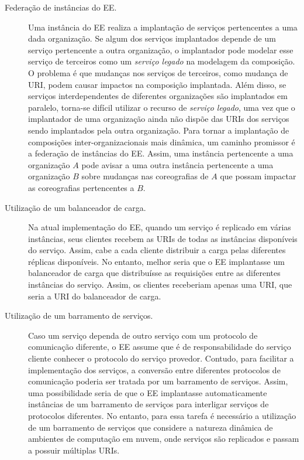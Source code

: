 \begin{description}
\item[Federação de instâncias do EE.] Uma instância do EE realiza a implantação
de serviços pertencentes a uma dada organização. Se algum dos serviços implantados
depende de um serviço pertencente a outra organização, o implantador
pode modelar esse serviço de terceiros como um \emph{serviço legado}
na modelagem da composição. O problema é que mudanças nos serviços de
terceiros, como mudança de URI, podem causar impactos na composição implantada.
Além disso, se serviços interdependentes de diferentes organizações são implantados em paralelo,
torna-se difícil utilizar o recurso de \emph{serviço legado},
uma vez que o implantador de uma organização ainda não dispõe das URIs 
dos serviços sendo implantados pela outra organização.
Para tornar a implantação de composições inter-organizacionais mais dinâmica,
um caminho promissor é a federação de instâncias do EE.
Assim, uma instância pertencente a uma organização $A$ pode avisar a
uma outra instância pertencente a uma organização $B$ sobre mudanças 
nas coreografias de $A$ que possam impactar as coreografias pertencentes a $B$.

\item[Utilização de um balanceador de carga.] Na atual implementação do EE,
quando um serviço é replicado em várias instâncias, seus clientes
recebem as URIs de todas as instâncias disponíveis do serviço.
Assim, cabe a cada cliente distribuir a carga pelas diferentes réplicas disponíveis.
No entanto, melhor seria que o EE implantasse um balanceador de carga 
que distribuísse as requisições entre as diferentes instâncias do serviço.
Assim, os clientes receberiam apenas uma URI, que seria a URI
do balanceador de carga.

\item[Utilização de um barramento de serviços.] Caso um serviço dependa
de outro serviço com um protocolo de comunicação diferente, o EE assume que é de
responsabilidade do serviço cliente conhecer o protocolo do serviço provedor.
Contudo, para facilitar a implementação dos serviços, a conversão entre
diferentes protocolos de comunicação poderia ser tratada por um barramento de serviços.
Assim, uma possibilidade seria de que o EE implantasse automaticamente instâncias
de um barramento de serviços para interligar serviços de protocolos diferentes.
No entanto, para essa tarefa é necessário a utilização de um barramento de serviços
que considere a natureza dinâmica de ambientes de computação em nuvem,
onde serviços são replicados e passam a possuir múltiplas URIs.


\end{description}
